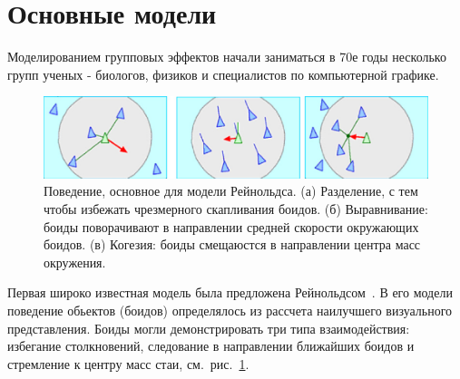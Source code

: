    \section{Основные модели} %
    \label{sec:CompModelsBasics}
    Моделированием групповых эффектов начали заниматься в 70е годы несколько групп ученых - биологов, физиков и специалистов по компьютерной графике. 
    \begin{figure}
        \centering
        \includegraphics[width=\textwidth]{Images/Fig31_CollectiveMotion}
        \caption{Поведение, основное для модели Рейнольдса. (а) Разделение, с тем чтобы избежать чрезмерного скапливания боидов. (б) Выравнивание: боиды поворачивают в направлении средней скорости окружающих боидов. (в) Когезия: боиды смещаюстся в направлении центра масс окружения.}
        \label{fig:ReynoldsModel}
    \end{figure}
    Первая широко известная модель была предложена Рейнольдсом~\cite{reynolds1987}. В его модели поведение обьектов (боидов) определялось из рассчета наилучшего визуального представления. Боиды могли демонстрировать три типа взаимодействия: избегание столкновений, следование в направлении ближайших боидов и стремление к центру масс стаи, см.~рис.~\ref{fig:ReynoldsModel}. 

